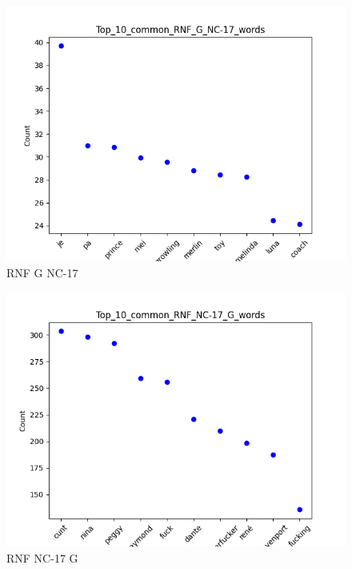 \documentclass[a4paper]{article}
\begin{document}
\begin{figure}[ht]
    \centering
    \includegraphics[width=1\textwidth]{../stats/Top_10_common_RNF_G_NC-17_words.png}
    \caption{RNF G NC-17}
\end{figure}


\begin{figure}[ht]
    \centering
    \includegraphics[width=1\textwidth]{../stats/Top_10_common_RNF_NC-17_G_words.png}
    \caption{RNF NC-17 G}
\end{figure}
\end{document}
